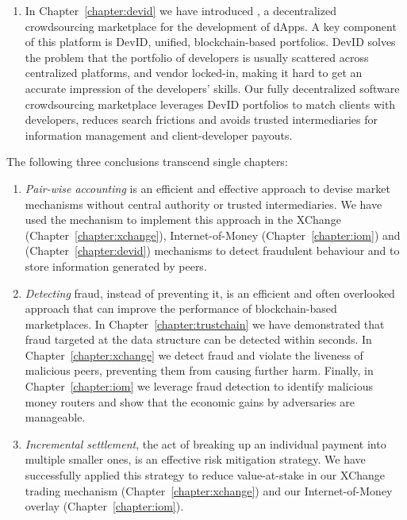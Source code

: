 \begin{enumerate}
	\item In Chapter~\ref{chapter:devid} we have introduced \Dappcoder{}, a decentralized crowdsourcing marketplace for the development of dApps.
	A key component of this platform is DevID, unified, blockchain-based portfolios.
	DevID solves the problem that the portfolio of developers is usually scattered across centralized platforms, and vendor locked-in, making it hard to get an accurate impression of the developers' skills.
	Our fully decentralized software crowdsourcing marketplace leverages DevID portfolios to match clients with developers, reduces search frictions and avoids trusted intermediaries for information management and client-developer payouts.
\end{enumerate}

\noindent The following three conclusions transcend single chapters:

\begin{enumerate}[resume]	
	\item \emph{Pair-wise accounting} is an efficient and effective approach to devise market mechanisms without central authority or trusted intermediaries.
	We have used the \TrustChain{} mechanism to implement this approach in the XChange (Chapter~\ref{chapter:xchange}), Internet-of-Money (Chapter~\ref{chapter:iom}) and \Dappcoder{} (Chapter~\ref{chapter:devid}) mechanisms to detect fraudulent behaviour and to store information generated by peers.
	
	\item \emph{Detecting} fraud, instead of preventing it, is an efficient and often overlooked approach that can improve the performance of blockchain-based marketplaces.
	In Chapter~\ref{chapter:trustchain} we have demonstrated that fraud targeted at the \TrustChain{} data structure can be detected within seconds.
	In Chapter~\ref{chapter:xchange} we detect fraud and violate the liveness of malicious peers, preventing them from causing further harm.
	Finally, in Chapter~\ref{chapter:iom} we leverage fraud detection to identify malicious money routers and show that the economic gains by adversaries are manageable.
	
	\item \emph{Incremental settlement}, the act of breaking up an individual payment into multiple smaller ones, is an effective risk mitigation strategy.
	We have successfully applied this strategy to reduce value-at-stake in our XChange trading mechanism (Chapter~\ref{chapter:xchange}) and our Internet-of-Money overlay (Chapter~\ref{chapter:iom}).
	
\end{enumerate}

